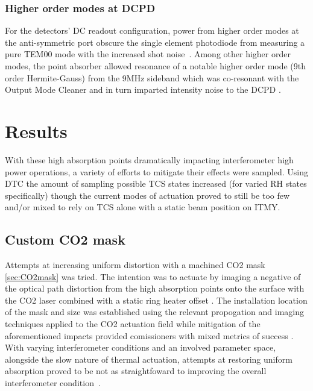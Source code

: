 

\subsubsection{Higher order modes at DCPD}
For the detectors' DC readout configuration, power from higher order modes at the anti-symmetric port obscure the single element photodiode from measuring a pure TEM00 mode with the increased shot noise~\cite{fricke:2012}. Among other higher order modes, the point absorber allowed resonance of a notable higher order mode (9th order Hermite-Gauss) from the 9MHz sideband which was co-resonant with the Output Mode Cleaner and in turn imparted intensity noise to the DCPD \cite{elog:2019_03_03:brown}.


\section{Results}
With these high absorption points dramatically impacting interferometer high power operations, a variety of efforts to mitigate their effects were sampled. Using DTC the amount of sampling possible TCS states increased (for varied RH states specifically) though the current modes of actuation proved to still be too few and/or mixed to rely on TCS alone with a static beam position on ITMY.    

\subsection{Custom CO2 mask}
Attempts at increasing uniform distortion with a machined CO2 mask \autoref{sec:CO2mask} was tried. The intention was to actuate by imaging a negative of the optical path distortion from the high absorption points onto the surface with the CO2 laser combined with a static ring heater offset \cite{elog:2019_02_17:brooks}. The installation location of the mask and size was established using the relevant propogation and imaging techniques applied to the CO2 actuation field while mitigation of the aforementioned impacts provided comissioners with mixed metrics of success \cite{elog:2019_03_28:mansell, elog:2019_02_22:brown}. With varying interferometer conditions and an involved parameter space, alongside the slow nature of thermal actuation, attempts at restoring uniform absorption proved to be not as straightfoward to improving the overall interferometer condition~\cite{brooks:aigwd2019, buikema:2020}. 

